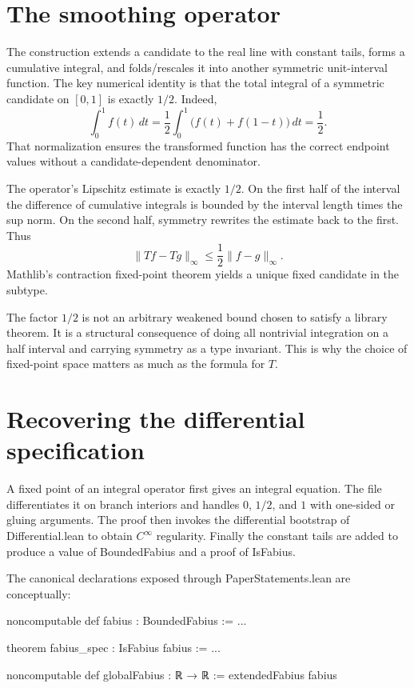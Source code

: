 \documentclass[11pt,a4paper,openany]{book}
\def\module#1{#1.lean}
\def\decl#1{#1}
\newcommand{\module}[1]{\nolinkurl{#1.lean}}
\newcommand{\decl}[1]{\texttt{\detokenize{#1}}}
\begin{document}
\section{The smoothing operator}
The construction extends a candidate to the real line with constant tails,
forms a cumulative integral, and folds/rescales it into another symmetric
unit-interval function.  The key numerical identity is that the total integral
of a symmetric candidate on $[0,1]$ is exactly $1/2$.  Indeed,
\[
 \int_0^1 f(t)\,dt
 =\frac12\int_0^1\bigl(f(t)+f(1-t)\bigr)\,dt
 =\frac12.
\]
That normalization ensures the transformed function has the correct endpoint
values without a candidate-dependent denominator.

The operator's Lipschitz estimate is exactly $1/2$.  On the first half of the
interval the difference of cumulative integrals is bounded by the interval
length times the sup norm.  On the second half, symmetry rewrites the estimate
back to the first.  Thus
\[
 \|Tf-Tg\|_\infty\le\frac12\|f-g\|_\infty.
\]
Mathlib's contraction fixed-point theorem yields a unique fixed candidate in
the subtype.

\begin{proofidea}
The factor $1/2$ is not an arbitrary weakened bound chosen to satisfy a
library theorem.  It is a structural consequence of doing all nontrivial
integration on a half interval and carrying symmetry as a type invariant.
This is why the choice of fixed-point space matters as much as the formula for
$T$.
\end{proofidea}

\section{Recovering the differential specification}
A fixed point of an integral operator first gives an integral equation.  The
file differentiates it on branch interiors and handles $0$, $1/2$, and $1$
with one-sided or gluing arguments.  The proof then invokes the differential
bootstrap of \module{Differential} to obtain $C^\infty$ regularity.  Finally the
constant tails are added to produce a value of \decl{BoundedFabius} and a proof
of \decl{IsFabius}.

The canonical declarations exposed through \module{PaperStatements} are
conceptually:

\begin{LeanCode}
noncomputable def fabius : BoundedFabius := ...

theorem fabius_spec : IsFabius fabius := ...

noncomputable def globalFabius : ℝ → ℝ :=
  extendedFabius fabius
\end{LeanCode}
\end{document}
